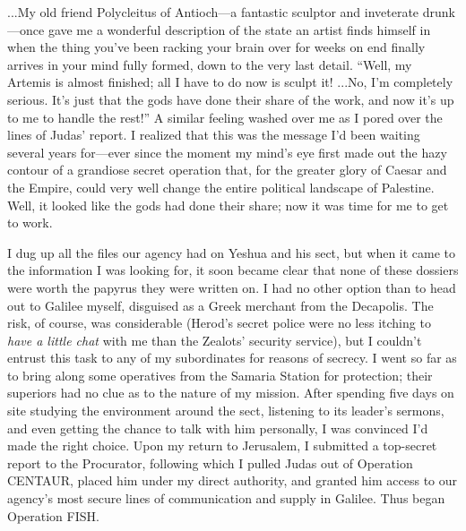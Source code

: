 ...My old friend Polycleitus of Antioch---a fantastic sculptor and inveterate drunk---once gave me a wonderful description of the state an artist finds himself in when the thing you've been racking your brain over for weeks on end finally arrives in your mind fully formed, down to the very last detail. ``Well, my Artemis is almost finished; all I have to do now is sculpt it! ...No, I'm completely serious. It's just that the gods have done their share of the work, and now it's up to me to handle the rest!'' A similar feeling washed over me as I pored over the lines of Judas' report. I realized that this was the message I'd been waiting several years for---ever since the moment my mind's eye first made out the hazy contour of a grandiose secret operation that, for the greater glory of Caesar and the Empire, could very well change the entire political landscape of Palestine. Well, it looked like the gods had done their share; now it was time for me to get to work.

I dug up all the files our agency had on Yeshua and his sect, but when it came to the information I was looking for, it soon became clear that none of these dossiers were worth the papyrus they were written on. I had no other option than to head out to Galilee myself, disguised as a Greek merchant from the Decapolis. The risk, of course, was considerable (Herod's secret police were no less itching to \emph{have a little chat} with me than the Zealots' security service), but I couldn't entrust this task to any of my subordinates for reasons of secrecy. I went so far as to bring along some operatives from the Samaria Station for protection; their superiors had no clue as to the nature of my mission. After spending five days on site studying the environment around the sect, listening to its leader's sermons, and even getting the chance to talk with him personally, I was convinced I'd made the right choice. Upon my return to Jerusalem, I submitted a top-secret report to the Procurator, following which I pulled Judas out of Operation CENTAUR, placed him under my direct authority, and granted him access to our agency's most secure lines of communication and supply in Galilee. Thus began Operation FISH.


